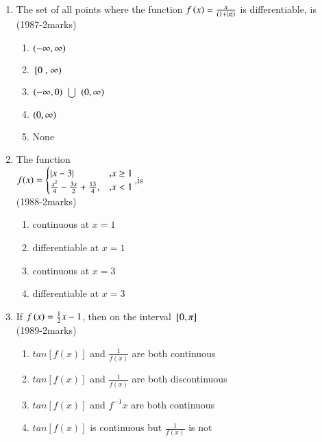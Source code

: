 \documentclass[journal,12pt,twocolumn]{IEEEtran}
\theoremstyle{remark}
\begin{document}
\begin{enumerate}
\item The set of all points where the function $f\left(x\right)=\frac{x}{(1+\left\vert x\right\vert)}$ is differentiable, is \\
\hfill{(1987-2marks)} 

\begin{enumerate}
	\item $\left(- \infty, \infty\right)$
	\item ${}\left[0\right., \left.\infty\right)$
	\item $\left(- \infty,0\right)$ $\bigcup$ $\left(0, \infty\right)$
	\item $\left(0, \infty\right)$
    \item None \\
\end{enumerate}
\item The function \\ $f(x)=\begin{cases}\left\vert x-3\right\vert & \text{,} x \geq 1 \\
    \frac{x^2}{4}-\frac{3x}{2}+\frac{13}{4}, & \text{,} x<1 
\end{cases}$,is \\ \hfill{(1988-2marks)} 
\begin{enumerate}
    \item continuous at $x=1$
    \item differentiable at $x=1$
    \item continuous at $x=3$
    \item differentiable at $x=3$ \\ 
\end{enumerate}
\item If $f\left(x\right) = \frac{1}{2}x-1$, then on the interval ${}\left[0,\pi\right]$ \\ \hfill{(1989-2marks)} 
\begin{enumerate}
    \item $tan[f(x)]$ and $\frac{1}{f(x)}$ are both continuous
    \item $tan[f(x)]$ and $\frac{1}{f(x)}$ are both discontinuous
    \item $tan[f(x)]$ and $f^{-1}x$ are both continuous
    \item $tan[f(x)]$ is continuous but $\frac{1}{f(x)}$ is not \\
\end{enumerate}


\end{enumerate}
\end{document}
